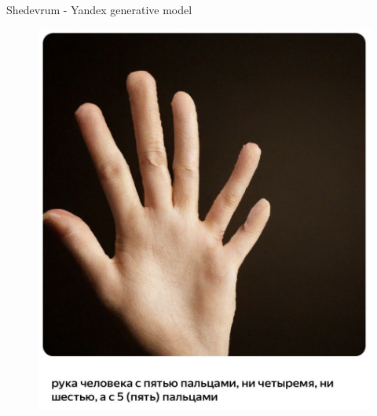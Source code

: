 \begin{frame}{Shedevrum - Yandex generative model}
\begin{minipage}[t]{0.5\columnwidth}
\begin{figure}
				\includegraphics[width=\linewidth]{figs/shedevrum2}
			\end{figure}
		\end{minipage}
\end{frame}
